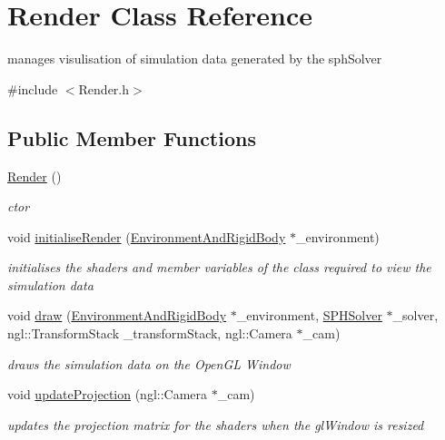 \hypertarget{class_render}{
\section{Render Class Reference}
\label{class_render}
}


manages visulisation of simulation data generated by the sphSolver  




{\ttfamily \#include $<$Render.h$>$}

\subsection*{Public Member Functions}
\begin{DoxyCompactItemize}
\item 
\hyperlink{class_render_a8610cc11739ef679b5935dd819021351}{Render} ()
\begin{DoxyCompactList}\small\item\em ctor \item\end{DoxyCompactList}\item 
void \hyperlink{class_render_a52ff4b4560ad5ef64c8babfc2132e7c0}{initialiseRender} (\hyperlink{class_environment_and_rigid_body}{EnvironmentAndRigidBody} $\ast$\_\-environment)
\begin{DoxyCompactList}\small\item\em initialises the shaders and member variables of the class required to view the simulation data \item\end{DoxyCompactList}\item 
void \hyperlink{class_render_abff096b6a70647c4e22272f51df53417}{draw} (\hyperlink{class_environment_and_rigid_body}{EnvironmentAndRigidBody} $\ast$\_\-environment, \hyperlink{class_s_p_h_solver}{SPHSolver} $\ast$\_\-solver, ngl::TransformStack \_\-transformStack, ngl::Camera $\ast$\_\-cam)
\begin{DoxyCompactList}\small\item\em draws the simulation data on the OpenGL Window \item\end{DoxyCompactList}\item 
void \hyperlink{class_render_adee537ebd2b8e1e06163d8021d7f0e67}{updateProjection} (ngl::Camera $\ast$\_\-cam)
\begin{DoxyCompactList}\small\item\em updates the projection matrix for the shaders when the glWindow is resized \item\end{DoxyCompactList}\end{DoxyCompactItemize}
